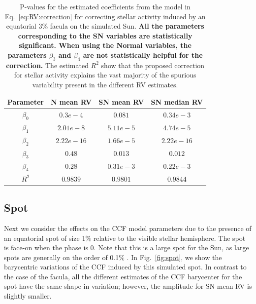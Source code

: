 \documentclass{aa}
\begin{document}
\begin{table}
\begin{center}
\caption{P-values for the estimated coefficients from the model in Eq.~\eqref{eq:RV:correction} for correcting stellar activity induced by an equatorial 3\% facula on the simulated Sun. {\bf{All the parameters corresponding to the SN variables are statistically significant. When using the Normal variables, the parameters $\beta_{3}$ and $\beta_{4}$ are not statistically helpful for the correction.}} The estimated $R^{2}$ show that the proposed correction for stellar activity explains the vast majority of the spurious variability present in the different RV estimates.}
\label{table:faculae.test}
\begin{tabular}{|c|c|c|c|}
\hline
Parameter          & N mean RV         &   SN mean RV &   SN median RV \\
\hline
$\beta_{0}$            &    $0.3e-4$    & $0.081$ & $0.34e-3$ \\
\hline
$\beta_{1}$            &    $2.01e-8 $    & $5.11e-5 $ & $4.74e-5 $ \\
\hline
$\beta_{2}$            &     $2.22e-16$   &  $1.66e-5 $ & $2.22e-16 $\\
\hline
$\beta_{3}$            &     $0.48$   &  $0.013$ & $0.012$\\
\hline
$\beta_{4}$            &     $0.28$   &  $0.31e-3$ & $0.22e-3$\\
\hline
$R^{2}$      &     $0.9839$    &  $0.9801$ & $0.9844$  \\
\hline
\end{tabular}
\end{center}
\end{table}










\subsection{Spot} \label{sec:soap.spot}

Next we consider the effects on the CCF model parameters due to the presence of an equatorial spot of size 1\% relative to the visible stellar hemisphere. 
The spot is face-on when the phase is 0. 
Note that this is a large spot for the Sun, as large spots are generally on the order of 0.1\% \citep[e.g.][]{Borgniet-2015}. 
In Fig.~\ref{fig:spot}, we show the barycentric variations of the CCF induced by this simulated spot. 
In contrast to the case of the facula, all the different estimates of the CCF barycenter for the spot have the same shape in variation; however, the amplitude for SN mean RV is slightly smaller.
\end{document}
